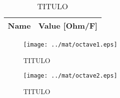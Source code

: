 \begin{table}[H]
  \centering
  \begin{tabular}{|l|r|}
    \hline    
    {\bf Name} & {\bf Value [Ohm/F]} \\ \hline
    
  \end{tabular}
  \caption{TITULO}
  \label{tab:mat2}
\end{table}

\begin{figure}[H] \centering
\texttt{[image: ../mat/octave1.eps]}
\caption{TITULO}
\label{fig:mat3}
\end{figure}

\begin{figure}[H] \centering
\texttt{[image: ../mat/octave2.eps]}
\caption{TITULO}
\label{fig:mat4}
\end{figure}






